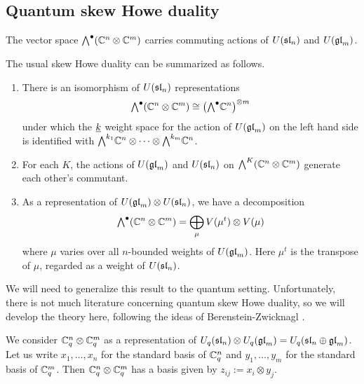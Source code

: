 \documentclass[11pt]{amsart}
\begin{document}
\subsection{Quantum skew Howe duality}\label{sec:quantumskew}

The vector space $\Alt{\bullet}{}(\mathbb C^n \otimes \mathbb C^m)$ carries commuting actions of $U(\sl_n)$ and $U(\gl_m)$.

\begin{thm}\mbox{}
The usual skew Howe duality \cite{MR986027,MR1321638} can be summarized as follows.
\begin{enumerate}
\item There is an isomorphism of $ U(\sl_n) $ representations
\begin{equation}
 \Alt{\bullet}{}(\mathbb C^n \otimes \mathbb C^m) \cong \left( \Alt{\bullet}{} \bC^n \right)^{\otimes m}
 \end{equation}
under which the $ \ul{k} $ weight space for the action of $ U(\gl_m) $ on the left hand side is identified with $\Alt{k_1}{} \mathbb C^n \otimes \cdots \otimes \Alt{k_m}{} \mathbb C^n$.
\item For each $ K $, the actions of $ U(\gl_m) $ and $ U(\sl_n) $ on $ \Alt{K}{}(\bC^n \otimes \bC^m) $ generate each other's commutant.
\item As a representation of $ U(\gl_m) \otimes U(\sl_n)$, we have a decomposition
$$ \Alt{\bullet}{} (\mathbb C^n \otimes \mathbb C^m) = \bigoplus_{\mu} V(\mu^t) \otimes V(\mu) $$
where $\mu$ varies over all $n$-bounded weights of $U(\gl_m)$. Here $\mu^t$ is the transpose of $\mu$, regarded as a weight of $U(\sl_n)$.
\end{enumerate}
\end{thm}

We will need to generalize this result to the quantum setting.  Unfortunately, there is not much literature concerning quantum skew Howe duality, so we will develop the theory here, following the ideas of Berenstein-Zwicknagl \cite{BZ}.

We consider $ \bC^n_q \otimes \bC^m_q $ as a representation of $U_q(\sl_n) \otimes U_q(\gl_m) = U_q(\sl_n \oplus \gl_m) $. Let us write $ x_1, \dots, x_n $ for the standard basis of $ \bC_q^n $ and $ y_1, \dots, y_m $ for the standard basis of $ \bC_q^m $.  Then $ \bC_q^n \otimes \bC_q^m $ has a basis given by $ z_{ij} := x_i \otimes y_j $.
\end{document}

